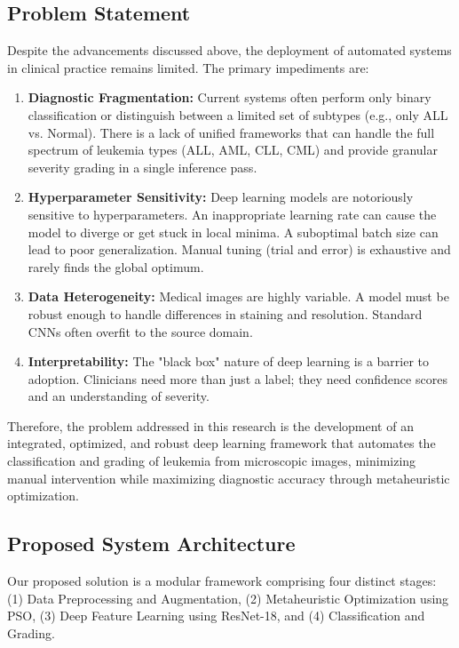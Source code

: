 \documentclass[12pt, a4paper]{article}
\begin{document}
\subsection{Problem Statement}

Despite the advancements discussed above, the deployment of automated systems in clinical practice remains limited. The primary impediments are:

\begin{enumerate}
    \item \textbf{Diagnostic Fragmentation:} Current systems often perform only binary classification or distinguish between a limited set of subtypes (e.g., only ALL vs. Normal). There is a lack of unified frameworks that can handle the full spectrum of leukemia types (ALL, AML, CLL, CML) and provide granular severity grading in a single inference pass.
    
    \item \textbf{Hyperparameter Sensitivity:} Deep learning models are notoriously sensitive to hyperparameters. An inappropriate learning rate can cause the model to diverge or get stuck in local minima. A suboptimal batch size can lead to poor generalization. Manual tuning (trial and error) is exhaustive and rarely finds the global optimum.
    
    \item \textbf{Data Heterogeneity:} Medical images are highly variable. A model must be robust enough to handle differences in staining and resolution. Standard CNNs often overfit to the source domain.
    
    \item \textbf{Interpretability:} The "black box" nature of deep learning is a barrier to adoption. Clinicians need more than just a label; they need confidence scores and an understanding of severity.
\end{enumerate}

Therefore, the problem addressed in this research is the development of an integrated, optimized, and robust deep learning framework that automates the classification and grading of leukemia from microscopic images, minimizing manual intervention while maximizing diagnostic accuracy through metaheuristic optimization.

\subsection{Proposed System Architecture}

Our proposed solution is a modular framework comprising four distinct stages: (1) Data Preprocessing and Augmentation, (2) Metaheuristic Optimization using PSO, (3) Deep Feature Learning using ResNet-18, and (4) Classification and Grading.
\end{document}
